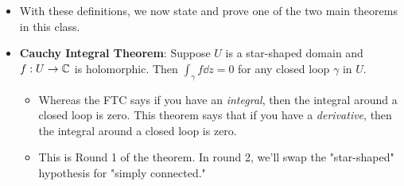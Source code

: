 \documentclass[../notes.tex]{subfiles}
\begin{document}
\begin{itemize}
\begin{figure}[h!]
        \vspace{-3em}
        \caption{A triangle in a star-shaped domain.}
        \label{fig:triangleStar}
    \end{figure}
    \vspace{-1em}
    \begin{proof}
        What should be our candidate for $F(z)$? Define
        \begin{equation*}
            F(z) = \int_\gamma f\dd{z}
        \end{equation*}
        where $\gamma$ is the line segment from $a\to z$ that we know exists because $U$ is star-shaped.\par
        We now have to show that $F$ is holomorphic with $F'=f$, but we just do this as before by constructing a "closed loop," except our closed loop this time will just be a triangle as drawn in Figure \ref{fig:triangleStar}.
    \end{proof}
    \item With these definitions, we now state and prove one of the two main theorems in this class.
    \item \textbf{Cauchy Integral Theorem}: Suppose $U$ is a star-shaped domain and $f:U\to\mathbb{C}$ is holomorphic. Then $\int_\gamma f\dd{z}=0$ for any closed loop $\gamma$ in $U$.
    \begin{itemize}
        \item Whereas the FTC says if you have an \emph{integral}, then the integral around a closed loop is zero. This theorem says that if you have a \emph{derivative}, then the integral around a closed loop is zero.
        \item This is Round 1 of the theorem. In round 2, we'll swap the "star-shaped" hypothesis for "simply connected."

\end{itemize}
\end{itemize}
\end{document}
